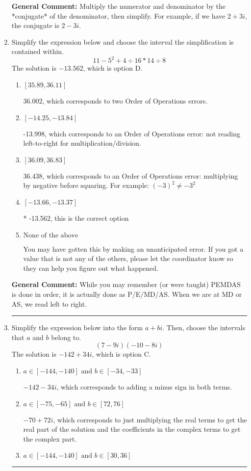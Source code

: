 \documentclass{extbook}[14pt]
\newcommand{\litem}[1]{\item #1

\rule{\textwidth}{0.4pt}}
\begin{document}
\begin{enumerate}
{\textbf{General Comment:} Multiply the numerator and denominator by the *conjugate* of the denominator, then simplify. For example, if we have $2+3i$, the conjugate is $2-3i$.
}
\litem{
Simplify the expression below and choose the interval the simplification is contained within.
\[ 11 - 5^2 + 4 \div 16 * 14 \div 8 \]The solution is \( -13.562 \), which is option D.\begin{enumerate}[label=\Alph*.]
\item \( [35.89, 36.11] \)

 36.002, which corresponds to two Order of Operations errors.
\item \( [-14.25, -13.84] \)

 -13.998, which corresponds to an Order of Operations error: not reading left-to-right for multiplication/division.
\item \( [36.09, 36.83] \)

 36.438, which corresponds to an Order of Operations error: multiplying by negative before squaring. For example: $(-3)^2 \neq -3^2$
\item \( [-13.66, -13.37] \)

* -13.562, this is the correct option
\item \( \text{None of the above} \)

 You may have gotten this by making an unanticipated error. If you got a value that is not any of the others, please let the coordinator know so they can help you figure out what happened.
\end{enumerate}

\textbf{General Comment:} While you may remember (or were taught) PEMDAS is done in order, it is actually done as P/E/MD/AS. When we are at MD or AS, we read left to right.
}
\litem{
Simplify the expression below into the form $a+bi$. Then, choose the intervals that $a$ and $b$ belong to.
\[ (7 - 9 i)(-10 - 8 i) \]The solution is \( -142 + 34 i \), which is option C.\begin{enumerate}[label=\Alph*.]
\item \( a \in [-144, -140] \text{ and } b \in [-34, -33] \)

 $-142 - 34 i$, which corresponds to adding a minus sign in both terms.
\item \( a \in [-75, -65] \text{ and } b \in [72, 76] \)

 $-70 + 72 i$, which corresponds to just multiplying the real terms to get the real part of the solution and the coefficients in the complex terms to get the complex part.
\item \( a \in [-144, -140] \text{ and } b \in [30, 36] \)


\end{enumerate}}
\end{enumerate}
\end{document}
